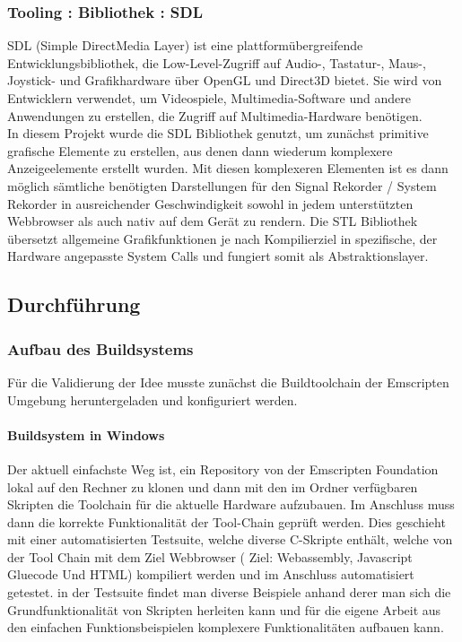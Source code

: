 \subsubsection{Tooling : Bibliothek : SDL}
SDL (Simple DirectMedia Layer) ist eine plattformübergreifende Entwicklungsbibliothek, die Low-Level-Zugriff auf Audio-, Tastatur-, Maus-, Joystick- und Grafikhardware über OpenGL und Direct3D bietet. Sie wird von Entwicklern verwendet, um Videospiele, Multimedia-Software und andere Anwendungen zu erstellen, die Zugriff auf Multimedia-Hardware benötigen. \\
In diesem Projekt wurde die SDL Bibliothek genutzt, um zunächst primitive grafische Elemente zu erstellen, aus denen dann wiederum komplexere Anzeigeelemente erstellt wurden. Mit diesen komplexeren Elementen  ist es dann möglich sämtliche benötigten Darstellungen für den Signal Rekorder / System Rekorder in ausreichender Geschwindigkeit sowohl in jedem  unterstützten Webbrowser als auch nativ auf dem Gerät zu rendern. Die STL Bibliothek übersetzt allgemeine Grafikfunktionen je nach Kompilierziel in spezifische, der Hardware angepasste System Calls und fungiert somit als Abstraktionslayer. 
\cite*{sdlwebsite} \\
\subsection{Durchführung}
\subsubsection{Aufbau des Buildsystems}
Für die Validierung der Idee musste zunächst die Buildtoolchain der Emscripten Umgebung heruntergeladen und konfiguriert werden. 


\paragraph*{Buildsystem in Windows}
Der aktuell einfachste Weg ist, ein Repository von der Emscripten Foundation lokal auf den Rechner zu klonen und dann mit den im Ordner verfügbaren Skripten die Toolchain für die aktuelle Hardware aufzubauen. 
Im Anschluss muss dann die korrekte Funktionalität der Tool-Chain geprüft werden. Dies geschieht mit einer automatisierten Testsuite, welche diverse C-Skripte enthält, welche von der Tool Chain mit dem Ziel Webbrowser ( Ziel: Webassembly, Javascript Gluecode Und HTML) kompiliert werden und im Anschluss automatisiert getestet.
in der Testsuite findet man diverse Beispiele anhand derer man sich die Grundfunktionalität von Skripten herleiten kann und für die eigene Arbeit aus den einfachen Funktionsbeispielen komplexere Funktionalitäten aufbauen kann. \cite*{emscriptendownload}\\
